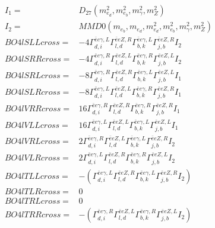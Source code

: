 \documentclass[A4,landscape]{article}
\begin{document}
\begin{align} 
I_1 = & D_{27}(m^2_{e_{{d}}}, m^2_{e_{{b}}}, m^2_{\gamma}, m^2_{Z}) \\ 
I_2 = & MMD0(m_{e_{{b}}}, m_{e_{{d}}}, m^2_{e_{{d}}}, m^2_{e_{{b}}}, m^2_{\gamma}, m^2_{Z}) \\ 
  BO4lSLLcross= & -4  \Gamma^{\bar{e}e \gamma ,L}_{d, i} \Gamma^{\bar{e}e Z ,R}_{l, d} \Gamma^{\bar{e}e \gamma ,L}_{b, k} \Gamma^{\bar{e}e Z ,R}_{j, b} I_2 \\ 
  BO4lSRRcross= & -4  \Gamma^{\bar{e}e \gamma ,R}_{d, i} \Gamma^{\bar{e}e Z ,L}_{l, d} \Gamma^{\bar{e}e \gamma ,R}_{b, k} \Gamma^{\bar{e}e Z ,L}_{j, b} I_2 \\ 
  BO4lSRLcross= & -8  \Gamma^{\bar{e}e \gamma ,R}_{d, i} \Gamma^{\bar{e}e Z ,R}_{l, d} \Gamma^{\bar{e}e \gamma ,L}_{b, k} \Gamma^{\bar{e}e Z ,L}_{j, b} I_1 \\ 
  BO4lSLRcross= & -8  \Gamma^{\bar{e}e \gamma ,L}_{d, i} \Gamma^{\bar{e}e Z ,L}_{l, d} \Gamma^{\bar{e}e \gamma ,R}_{b, k} \Gamma^{\bar{e}e Z ,R}_{j, b} I_1 \\ 
  BO4lVRRcross= & 16  \Gamma^{\bar{e}e \gamma ,R}_{d, i} \Gamma^{\bar{e}e Z ,R}_{l, d} \Gamma^{\bar{e}e \gamma ,R}_{b, k} \Gamma^{\bar{e}e Z ,R}_{j, b} I_1 \\ 
  BO4lVLLcross= & 16  \Gamma^{\bar{e}e \gamma ,L}_{d, i} \Gamma^{\bar{e}e Z ,L}_{l, d} \Gamma^{\bar{e}e \gamma ,L}_{b, k} \Gamma^{\bar{e}e Z ,L}_{j, b} I_1 \\ 
  BO4lVRLcross= & 2  \Gamma^{\bar{e}e \gamma ,R}_{d, i} \Gamma^{\bar{e}e Z ,L}_{l, d} \Gamma^{\bar{e}e \gamma ,L}_{b, k} \Gamma^{\bar{e}e Z ,R}_{j, b} I_2 \\ 
  BO4lVLRcross= & 2  \Gamma^{\bar{e}e \gamma ,L}_{d, i} \Gamma^{\bar{e}e Z ,R}_{l, d} \Gamma^{\bar{e}e \gamma ,R}_{b, k} \Gamma^{\bar{e}e Z ,L}_{j, b} I_2 \\ 
  BO4lTLLcross= & -( \Gamma^{\bar{e}e \gamma ,L}_{d, i} \Gamma^{\bar{e}e Z ,R}_{l, d} \Gamma^{\bar{e}e \gamma ,L}_{b, k} \Gamma^{\bar{e}e Z ,R}_{j, b} I_2) \\ 
  BO4lTLRcross= & 0 \\ 
  BO4lTRLcross= & 0 \\ 
  BO4lTRRcross= & -( \Gamma^{\bar{e}e \gamma ,R}_{d, i} \Gamma^{\bar{e}e Z ,L}_{l, d} \Gamma^{\bar{e}e \gamma ,R}_{b, k} \Gamma^{\bar{e}e Z ,L}_{j, b} I_2) \\ 
\end{align} 
\end{document}
